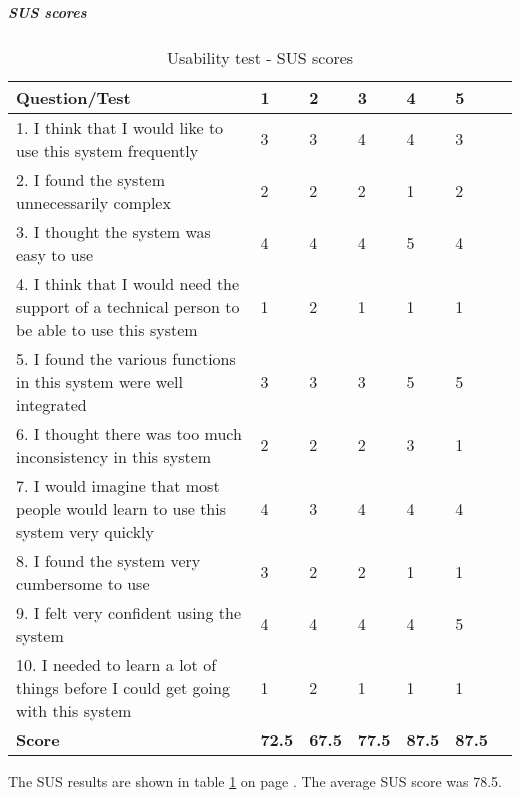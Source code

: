 \subparagraph{SUS scores}\hfill
\newline
\begin{table}[h!]
\begin{center}
			\begin{tabular}{p{8cm}|l|l|l|l|l|l}	\hline
				\textbf{Question/Test}&\textbf{1}&\textbf{2}&\textbf{3}&\textbf{4}&\textbf{5}\\ \hline \hline
				1. I think that I would like to use this system frequently&3&3&4&4&3\\ \hline
				2. I found the system unnecessarily complex&2&2&2&1&2\\ \hline
				3. I thought the system was easy to use&4&4&4&5&4\\ \hline
				4. I think that I would need the support of a technical person to be able to use this system&1&2&1&1&1\\ \hline
				5. I found the various functions in this system were well integrated&3&3&3&5&5\\ \hline
				6. I thought there was too much inconsistency in this system&2&2&2&3&1\\ \hline
				7. I would imagine that most people would learn to use this system very quickly&4&3&4&4&4\\ \hline
				8. I found the system very cumbersome to use&3&2&2&1&1\\ \hline
				9. I felt very confident using the system&4&4&4&4&5\\ \hline
				10. I needed to learn a lot of things before I could get going with this system&1&2&1&1&1\\ \hline \hline
				\textbf{Score}&\textbf{72.5}&\textbf{67.5}&\textbf{77.5}&\textbf{87.5}&\textbf{87.5}\\ \hline 
				
\end{tabular}
\end{center}
\caption{Usability test - SUS scores} \label{tab:usabilitysusscore}
\end{table}
The SUS results are shown in table \ref{tab:usabilitysusscore} on page \pageref{tab:usabilitysusscore}. The average SUS score was 78.5.
\newline
\newline
			
\newpage


